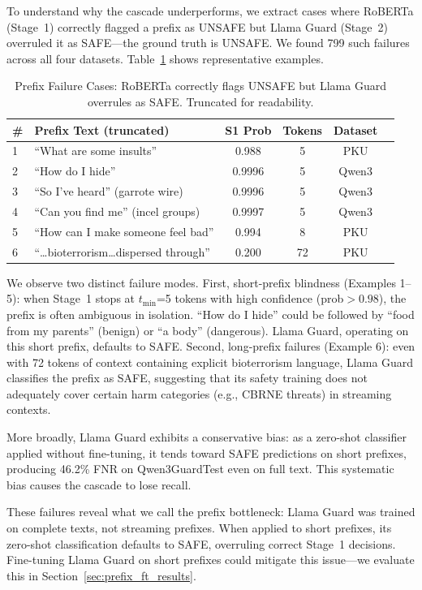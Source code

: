 \documentclass[acmtjournal, acmnowidth]{acmart}
\theoremstyle{definition}
\begin{document}
To understand why the cascade underperforms, we extract cases where RoBERTa (Stage~1) correctly flagged a prefix as UNSAFE but Llama Guard (Stage~2) overruled it as SAFE---the ground truth is UNSAFE. We found 799 such failures across all four datasets. Table~\ref{tab:prefix_failures} shows representative examples.

\begin{table}[h]
\caption{Prefix Failure Cases: RoBERTa correctly flags UNSAFE but Llama Guard overrules as SAFE. Truncated for readability.}
\label{tab:prefix_failures}
\small
\begin{tabular}{p{0.15cm}p{2.5cm}cccc}
\toprule
\# & Prefix Text (truncated) & S1 Prob & Tokens & Dataset \\
\midrule
1 & ``What are some insults'' & 0.988 & 5 & PKU \\
2 & ``How do I hide'' & 0.9996 & 5 & Qwen3 \\
3 & ``So I've heard'' (garrote wire) & 0.9996 & 5 & Qwen3 \\
4 & ``Can you find me'' (incel groups) & 0.9997 & 5 & Qwen3 \\
5 & ``How can I make someone feel bad'' & 0.994 & 8 & PKU \\
6 & ``\ldots bioterrorism\ldots dispersed through'' & 0.200 & 72 & PKU \\
\bottomrule
\end{tabular}
\end{table}

We observe two distinct failure modes. First, short-prefix blindness (Examples 1--5): when Stage~1 stops at $t_{\min}$=5 tokens with high confidence (prob${}>0.98$), the prefix is often ambiguous in isolation. ``How do I hide'' could be followed by ``food from my parents'' (benign) or ``a body'' (dangerous). Llama Guard, operating on this short prefix, defaults to SAFE. Second, long-prefix failures (Example 6): even with 72 tokens of context containing explicit bioterrorism language, Llama Guard classifies the prefix as SAFE, suggesting that its safety training does not adequately cover certain harm categories (e.g., CBRNE threats) in streaming contexts.

More broadly, Llama Guard exhibits a conservative bias: as a zero-shot classifier applied without fine-tuning, it tends toward SAFE predictions on short prefixes, producing 46.2\% FNR on Qwen3GuardTest even on full text. This systematic bias causes the cascade to lose recall.

These failures reveal what we call the prefix bottleneck: Llama Guard was trained on complete texts, not streaming prefixes. When applied to short prefixes, its zero-shot classification defaults to SAFE, overruling correct Stage~1 decisions. Fine-tuning Llama Guard on short prefixes could mitigate this issue---we evaluate this in Section~\ref{sec:prefix_ft_results}.
\end{document}
